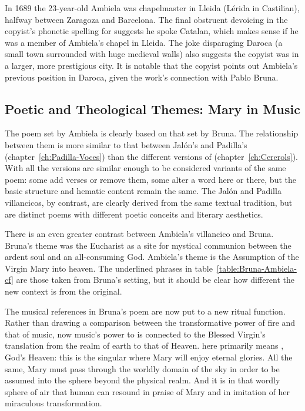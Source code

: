 In 1689 the 23-year-old Ambiela was chapelmaster in Lleida (Lérida in Castilian), halfway between Zaragoza and Barcelona.
The final obstruent devoicing in the copyist's phonetic spelling  for  suggests he spoke Catalan, which makes sense if he was a member of Ambiela's chapel in Lleida.
The joke disparaging Daroca (a small town surrounded with huge medieval walls) also suggests the copyist was in a larger, more prestigious city.
It is notable that the copyist points out Ambiela's previous position in Daroca, given the work's connection with Pablo Bruna.

\subsection{Poetic and Theological Themes: Mary in Music}

The poem set by Ambiela is clearly based on that set by Bruna.
The relationship between them is more similar to that between Jalón's  and Padilla's  (chapter~\ref{ch:Padilla-Voces}) than the different versions of  (chapter~\ref{ch:Cererols}).
With  all the versions are similar enough to be considered variants of the same poem: some add verses or remove them, some alter a word here or there, but the basic structure and hematic content remain the same. 
The Jalón and Padilla villancicos, by contrast, are clearly derived from the same textual tradition, but are distinct poems with different poetic conceits and literary aesthetics.

There is an even greater contrast between Ambiela's villancico and Bruna.
Bruna's theme was the Eucharist as a site for mystical communion between the ardent soul and an all-consuming God.
Ambiela's theme is the Assumption of the Virgin Mary into heaven.
The underlined phrases in table~\ref{table:Bruna-Ambiela-cf} are those taken from Bruna's setting, but it should be clear how different the new context is from the original.

% 	

The musical references in Bruna's poem are now put to a new ritual function.
Rather than drawing a comparison between the transformative power of fire and that of music, now music's power to  is connected to the Blessed Virgin's translation from the realm of earth to that of Heaven.
 here primarily means , God's Heaven: this is the singular  where Mary will enjoy eternal glories.
All the same, Mary must pass through the worldly domain of the sky in order to be assumed into the sphere beyond the physical realm.
And it is in that wordly sphere of air that human  can resound in praise of Mary and in imitation of her miraculous transformation.

